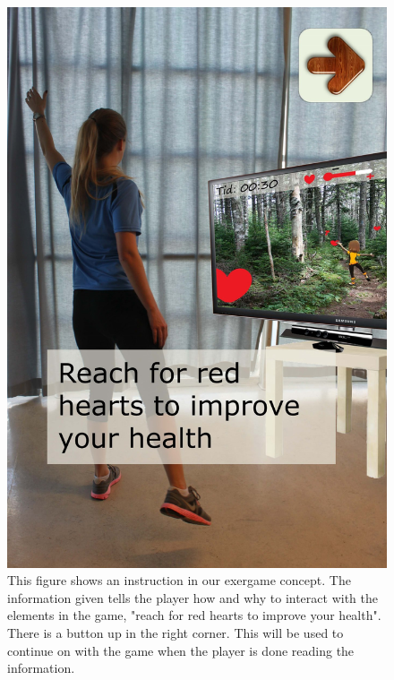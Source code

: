 \begin{figure} [H]
\centering
\includegraphics[scale=0.2]{introKineEng.jpg}
\caption[Instruction]{This figure shows an instruction in our exergame concept. The information given tells the player how and why to interact with the elements in the game, "reach for red hearts to improve your health". There is a button up in the right corner. This will be used to continue on with the game when the player is done reading the information.}
\label{fig:kineintro}
\end{figure}

